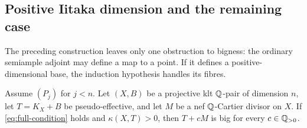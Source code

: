 \subsection{Positive Iitaka dimension and the remaining case}

The preceding construction leaves only one obstruction to bigness:
the ordinary semiample adjoint may define a map to a point.  If it
defines a positive-dimensional base, the induction hypothesis handles
its fibres.

\begin{proposition}\label{prop:full-positive}
Assume $(P_j)$ for $j<n$.  Let $(X,B)$ be a projective klt
$\mathbb Q$-pair of dimension $n$, let $T=K_X+B$ be pseudo-effective, and
let $M$ be a nef $\mathbb Q$-Cartier divisor on $X$.  If
\eqref{eq:full-condition} holds and $\kappa(X,T)>0$, then $T+cM$ is
big for every $c\in\mathbb Q_{>0}$.
\end{proposition}

